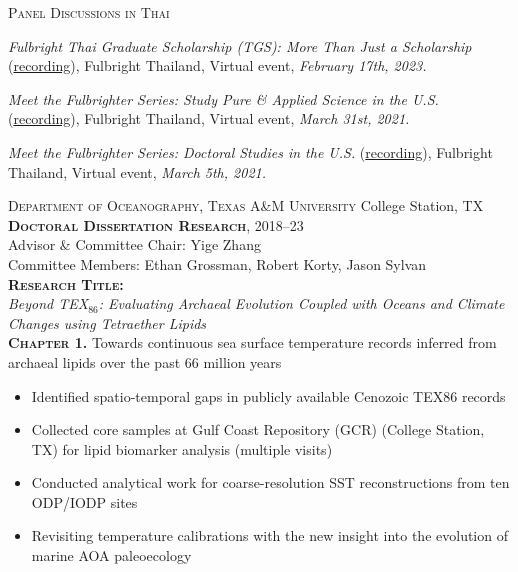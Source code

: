 \documentclass[10pt, letter]{article}
\newcommand{\margintext}[1]{\marginnote{\normalsize\textbf #1 |}}
\begin{document}
\textsc{Panel Discussions in Thai}
\begin{etaremune}
\item \textit{Fulbright Thai Graduate Scholarship (TGS): More Than Just a Scholarship} (\href{https://fb.watch/iLwkVkeNjJ/}{recording}), Fulbright Thailand, Virtual event, \textit{February 17th, 2023.}
\item \textit{Meet the Fulbrighter Series: Study Pure \& Applied Science in the U.S.} (\href{https://www.facebook.com/watch/?v=192470062421053}{recording}), Fulbright Thailand, Virtual event, \textit{March 31st, 2021.}
\item \textit{Meet the Fulbrighter Series: Doctoral Studies in the U.S.} (\href{https://www.facebook.com/watch/?v=1018096972055863}{recording}), Fulbright Thailand, Virtual event,\textit{ March 5th, 2021.} 
\end{etaremune}

\bigskip
\margintext{Previous Research Experience}
\textsc{Department of Oceanography, Texas A\&M University} \hfill College Station, TX \\
\textsc{\textbf{Doctoral Dissertation Research}}, 2018–23 \\
Advisor \& Committee Chair: Yige Zhang \\ 
Committee Members: Ethan Grossman, Robert Korty, Jason Sylvan \\

\textbf{\textsc{Research Title:}} \\
\textit{Beyond TEX$_{86}$: Evaluating Archaeal Evolution Coupled with Oceans and Climate Changes using Tetraether Lipids} \\

\textbf{\textsc{Chapter 1.}} Towards continuous sea surface temperature records inferred from archaeal lipids over the past 66 million years
\begin{itemize}[leftmargin=*]
    \item Identified spatio-temporal gaps in publicly available Cenozoic TEX86 records
    \item Collected core samples at Gulf Coast Repository (GCR) (College Station, TX) for lipid biomarker analysis (multiple visits)
    \item Conducted analytical work for coarse-resolution SST reconstructions from ten ODP/IODP sites
    \item Revisiting temperature calibrations with the new insight into the evolution of marine AOA paleoecology
\end{itemize}   
\end{document}
